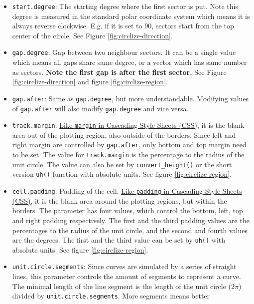 \documentclass[]{book}
\providecommand{\tightlist}{%
  \setlength{\itemsep}{0pt}\setlength{\parskip}{0pt}}
\theoremstyle{definition}
\theoremstyle{definition}
\theoremstyle{remark}
\begin{document}
\begin{itemize}
\tightlist
\item
  \texttt{start.degree}: The starting degree where the first sector is
  put. Note this degree is measured in the standard polar coordinate
  system which means it is always reverse clockwise. E.g. if it is set
  to 90, sectors start from the top center of the circle. See Figure
  \ref{fig:circlize-direction}.
\item
  \texttt{gap.degree}: Gap between two neighbour sectors. It can be a
  single value which means all gaps share same degree, or a vector which
  has same number as sectors. \textbf{Note the first gap is after the
  first sector.} See Figure \ref{fig:circlize-direction} and figure
  \ref{fig:circlize-region}.
\item
  \texttt{gap.after}: Same as \texttt{gap.degree}, but more
  understandable. Modifying values of \texttt{gap.after} will also
  modify \texttt{gap.degree} and vice versa.
\item
  \texttt{track.margin}:
  \href{https://www.w3schools.com/css/css_margin.asp}{Like
  \texttt{margin} in Cascading Style Sheets (CSS)}, it is the blank area
  out of the plotting region, also outside of the borders. Since left
  and right margin are controlled by \texttt{gap.after}, only bottom and
  top margin need to be set. The value for \texttt{track.margin} is the
  percentage to the radius of the unit circle. The value can also be set
  by \texttt{convert\_height()} or the short version \texttt{uh()}
  function with absolute units. See figure \ref{fig:circlize-region}.
\item
  \texttt{cell.padding}: Padding of the cell.
  \href{https://www.w3schools.com/css/css_padding.asp}{Like
  \texttt{padding} in Cascading Style Sheets (CSS)}, it is the blank
  area around the plotting regions, but within the borders. The
  parameter has four values, which control the bottom, left, top and
  right padding respectively. The first and the third padding values are
  the percentages to the radius of the unit circle, and the second and
  fourth values are the degrees. The first and the third value can be
  set by \texttt{uh()} with absolute units. See figure
  \ref{fig:circlize-region}.
\item
  \texttt{unit.circle.segments}: Since curves are simulated by a series
  of straight lines, this parameter controls the amount of segments to
  represent a curve. The minimal length of the line segment is the
  length of the unit circle (\(2\pi\)) divided by
  \texttt{unit.circle.segments}. More segments means better

\end{itemize}
\end{document}
